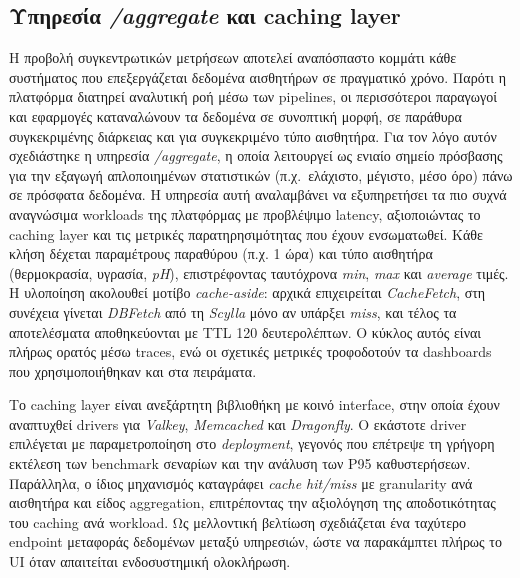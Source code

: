 \subsection{Υπηρεσία \textit{/aggregate} και caching layer}

Η προβολή συγκεντρωτικών μετρήσεων αποτελεί αναπόσπαστο κομμάτι κάθε συστήματος
που επεξεργάζεται δεδομένα αισθητήρων σε πραγματικό χρόνο. Παρότι η πλατφόρμα
διατηρεί αναλυτική ροή μέσω των pipelines, οι περισσότεροι παραγωγοί και
εφαρμογές καταναλώνουν τα δεδομένα σε συνοπτική μορφή, σε παράθυρα
συγκεκριμένης διάρκειας και για συγκεκριμένο τύπο αισθητήρα. Για τον λόγο αυτόν
σχεδιάστηκε η υπηρεσία \textit{/aggregate}, η οποία λειτουργεί ως ενιαίο σημείο
πρόσβασης για την εξαγωγή απλοποιημένων στατιστικών (π.χ.\ ελάχιστο, μέγιστο,
μέσο όρο) πάνω σε πρόσφατα δεδομένα. Η υπηρεσία αυτή αναλαμβάνει να
εξυπηρετήσει τα πιο συχνά αναγνώσιμα workloads της πλατφόρμας με προβλέψιμο
latency, αξιοποιώντας το caching layer και τις μετρικές παρατηρησιμότητας που
έχουν ενσωματωθεί. Κάθε κλήση δέχεται παραμέτρους παραθύρου (π.χ. 1 ώρα) και
τύπο αισθητήρα (θερμοκρασία, υγρασία, \textit{pH}), επιστρέφοντας ταυτόχρονα
\textit{min}, \textit{max} και \textit{average} τιμές. Η υλοποίηση ακολουθεί
μοτίβο \textit{cache-aside}: αρχικά επιχειρείται \textit{CacheFetch}, στη
συνέχεια γίνεται \textit{DBFetch} από τη \textit{Scylla} μόνο αν υπάρξει
\textit{miss}, και τέλος τα αποτελέσματα αποθηκεύονται με TTL 120
δευτερολέπτων. Ο κύκλος αυτός είναι πλήρως ορατός μέσω traces, ενώ οι σχετικές
μετρικές τροφοδοτούν τα dashboards που χρησιμοποιήθηκαν και στα πειράματα.

Το caching layer είναι ανεξάρτητη βιβλιοθήκη με κοινό interface, στην οποία
έχουν αναπτυχθεί drivers για \textit{Valkey}, \textit{Memcached} και
\textit{Dragonfly}. Ο εκάστοτε driver επιλέγεται με παραμετροποίηση στο
\textit{deployment}, γεγονός που επέτρεψε τη γρήγορη εκτέλεση των benchmark
σεναρίων και την ανάλυση των P95 καθυστερήσεων. Παράλληλα, ο ίδιος μηχανισμός
καταγράφει \textit{cache hit/miss} με granularity ανά αισθητήρα και είδος
aggregation, επιτρέποντας την αξιολόγηση της αποδοτικότητας του caching ανά
workload. Ως μελλοντική βελτίωση σχεδιάζεται ένα ταχύτερο endpoint μεταφοράς
δεδομένων μεταξύ υπηρεσιών, ώστε να παρακάμπτει πλήρως το UI όταν απαιτείται
ενδοσυστημική ολοκλήρωση.

